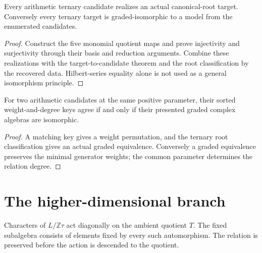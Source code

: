 \begin{theorem}
\label{thm:ternary-model}
\leanok
Every arithmetic ternary candidate realizes an actual canonical-root target. Conversely every ternary target is graded-isomorphic to a model from the enumerated candidates.
\end{theorem}
\begin{proof}
\leanok
{}
Construct the five monomial quotient maps and prove injectivity and surjectivity through their basis and reduction arguments. Combine these realizations with the target-to-candidate theorem and the root classification by the recovered data. Hilbert-series equality alone is not used as a general isomorphism principle.
\end{proof}

\begin{theorem}
\label{thm:key}
\leanok
For two arithmetic candidates at the same positive parameter, their sorted weight-and-degree keys agree if and only if their presented graded complex algebras are isomorphic.
\end{theorem}
\begin{proof}
\leanok
{}
A matching key gives a weight permutation, and the ternary root classification gives an actual graded equivalence. Conversely a graded equivalence preserves the minimal generator weights; the common parameter determines the relation degree.
\end{proof}

\section{The higher-dimensional branch}

\begin{definition}
\label{def:action}
\leanok
{}
Characters of $L/\mathbb Z\tau$ act diagonally on the ambient quotient $T$. The fixed subalgebra consists of elements fixed by every such automorphism. The relation is preserved before the action is descended to the quotient.
\end{definition}

